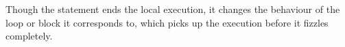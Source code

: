 Though the statement ends the local execution, it changes the behaviour of the loop
or block it corresponds to, which picks up the execution before it fizzles completely.

\begin{prooftree}
\end{prooftree}

\begin{prooftree}
\end{prooftree}

\begin{prooftree}
\end{prooftree}

\begin{prooftree}
\end{prooftree}
